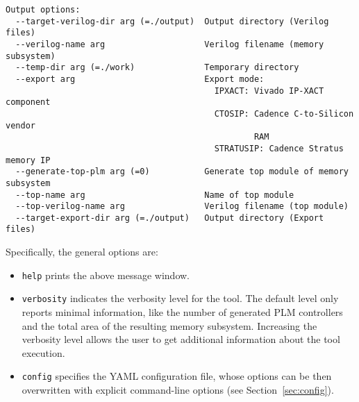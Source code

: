 \begin{verbatim}
Output options:
  --target-verilog-dir arg (=./output)  Output directory (Verilog files)
  --verilog-name arg                    Verilog filename (memory subsystem)
  --temp-dir arg (=./work)              Temporary directory
  --export arg                          Export mode:
                                          IPXACT: Vivado IP-XACT component
                                          CTOSIP: Cadence C-to-Silicon vendor
                                                  RAM
                                          STRATUSIP: Cadence Stratus memory IP
  --generate-top-plm arg (=0)           Generate top module of memory subsystem
  --top-name arg                        Name of top module
  --top-verilog-name arg                Verilog filename (top module)
  --target-export-dir arg (=./output)   Output directory (Export files)
\end{verbatim}

\noindent Specifically, the general options are:
\begin{itemize}
\item {\tt help} prints the above message window.
\item {\tt verbosity} indicates the verbosity level for the tool. The
  default level only reports minimal information, like the number of
  generated PLM controllers and the total area of the resulting memory
  subsystem.  Increasing the verbosity level allows the user to get
  additional information about the tool execution.
\item {\tt config} specifies the YAML configuration file, whose options can
  be then overwritten with explicit command-line options (see Section~\ref{sec:config}).
\end{itemize}


